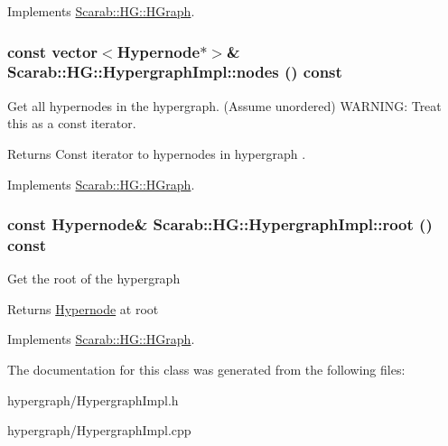 Implements \hyperlink{class_scarab_1_1_h_g_1_1_h_graph_a57328729f90cc4152ca79ff15ecdd4bb}{Scarab::HG::HGraph}.

\hypertarget{class_scarab_1_1_h_g_1_1_hypergraph_impl_a9aef2881b489c86d4d83e996a70f8141}{
\subsubsection[{nodes}]{\setlength{\rightskip}{0pt plus 5cm}const vector$<${\bf Hypernode}$\ast$$>$\& Scarab::HG::HypergraphImpl::nodes () const}}
\label{class_scarab_1_1_h_g_1_1_hypergraph_impl_a9aef2881b489c86d4d83e996a70f8141}
Get all hypernodes in the hypergraph. (Assume unordered) WARNING: Treat this as a const iterator. \begin{DoxyReturn}{Returns}
Const iterator to hypernodes in hypergraph . 
\end{DoxyReturn}


Implements \hyperlink{class_scarab_1_1_h_g_1_1_h_graph_a74d893fba015520774f71f02a46bb6ca}{Scarab::HG::HGraph}.

\hypertarget{class_scarab_1_1_h_g_1_1_hypergraph_impl_a31172009b97d179f6b1199f191197a32}{
\subsubsection[{root}]{\setlength{\rightskip}{0pt plus 5cm}const {\bf Hypernode}\& Scarab::HG::HypergraphImpl::root () const}}
\label{class_scarab_1_1_h_g_1_1_hypergraph_impl_a31172009b97d179f6b1199f191197a32}
Get the root of the hypergraph

\begin{DoxyReturn}{Returns}
\hyperlink{class_scarab_1_1_h_g_1_1_hypernode}{Hypernode} at root 
\end{DoxyReturn}


Implements \hyperlink{class_scarab_1_1_h_g_1_1_h_graph_a5ede392b158e41dd7e95ded1c4b0b5d6}{Scarab::HG::HGraph}.



The documentation for this class was generated from the following files:\begin{DoxyCompactItemize}
\item 
hypergraph/HypergraphImpl.h\item 
hypergraph/HypergraphImpl.cpp\end{DoxyCompactItemize}

